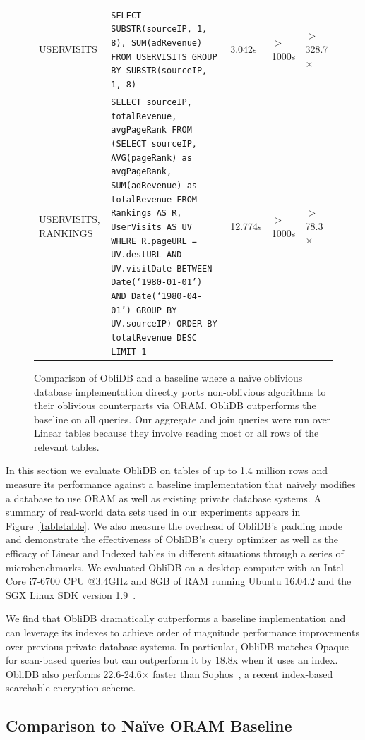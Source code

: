\documentclass[letterpaper,twocolumn,10pt]{article}
\def\name/{ObliDB}
\begin{document}
\begin{figure}
\begin{tabularx}{\textwidth}{p{1.9cm} X l l l}
USERVISITS & \footnotesize\texttt{SELECT SUBSTR(sourceIP, 1, 8), SUM(adRevenue) FROM USERVISITS GROUP BY SUBSTR(sourceIP, 1, 8)}& 3.042s &$>$1000s & $>$328.7$\times$\\\rule{0pt}{2ex}
USERVISITS, RANKINGS & \footnotesize\texttt{SELECT sourceIP, totalRevenue, avgPageRank
FROM
  (SELECT sourceIP,
          AVG(pageRank) as avgPageRank,
          SUM(adRevenue) as totalRevenue
    FROM Rankings AS R, UserVisits AS UV
    WHERE R.pageURL = UV.destURL
       AND UV.visitDate BETWEEN Date(`1980-01-01') AND Date(`1980-04-01')
    GROUP BY UV.sourceIP)
  ORDER BY totalRevenue DESC LIMIT 1} & 12.774s & $>$1000s& $>$78.3$\times$\\
\end{tabularx}
\caption{\small Comparison of \name/ and a baseline where a na\"ive oblivious database implementation directly ports non-oblivious algorithms to their oblivious counterparts via ORAM. \name/ outperforms the baseline on all queries. Our aggregate and join queries were run over Linear tables because they involve reading most or all rows of the relevant tables.}
\label{figQueries}
\end{figure}
In this section we evaluate \name/ on tables of up to 1.4 million rows and measure its performance against a baseline implementation that na\"ively modifies a database to use ORAM as well as existing private database systems. A summary of real-world data sets used in our experiments appears in Figure~\ref{tabletable}. We also measure the overhead of \name/'s padding mode and  demonstrate the effectiveness of \name/'s query optimizer as well as the efficacy of Linear and Indexed tables in different situations through a series of microbenchmarks. We evaluated \name/ on a desktop computer with an Intel Core i7-6700 CPU @3.4GHz and 8GB of RAM running Ubuntu 16.04.2 and the SGX Linux SDK version 1.9~\cite{SGXRef}.

We find that \name/ dramatically outperforms a baseline implementation and can leverage its indexes to achieve order of magnitude performance improvements over previous private database systems. In particular, \name/ matches Opaque~\cite{ZDB+17} for scan-based queries but can outperform it by 18.8x when it uses an index. \name/ also performs 22.6-24.6$\times$ faster than Sophos~\cite{Bost16}, a recent index-based searchable encryption scheme.

\subsection{Comparison to Na\"ive ORAM Baseline}
\end{document}
